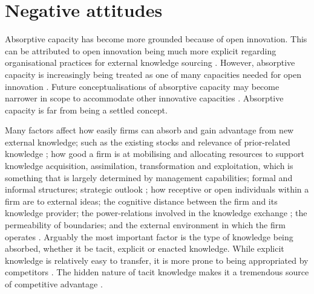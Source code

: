 \section{Negative attitudes}

Absorptive capacity has become more grounded because of open innovation. This can be attributed to open innovation being much more explicit regarding organisational practices for external knowledge sourcing \citep{volberda2010perspective}. However, absorptive capacity is increasingly being treated as one of many capacities needed for open innovation \citep[e.g.][]{lichtenthaler2009capability,lichtenthaler2010technology,robertson2012managing,ahn2016beyond}. Future conceptualisations of absorptive capacity may become narrower in scope to accommodate other innovative capacities \citep[viz.][]{lichtenthaler2009capability,lichtenthaler2010technology}. Absorptive capacity is far from being a settled concept. \medskip

Many factors affect how easily firms can absorb and gain advantage from new external knowledge; such as the existing stocks and relevance of prior-related knowledge \citep{cohen1990absorptive,lichtenthaler2016absorptive}; how good a firm is at mobilising and allocating resources to support knowledge acquisition, assimilation, transformation and exploitation, which is something that is largely determined by management capabilities; formal and informal structures; strategic outlook \citep{todorova2007absorptive,kim2016balancing,lichtenthaler2016absorptive}; how receptive or open individuals within a firm are to external ideas; the cognitive distance between the firm and its knowledge provider; the power-relations involved in the knowledge exchange \citep{nooteboom2000learning,todorova2007absorptive,easterby2008absorptive}; the permeability of boundaries; and the external environment in which the firm operates \citep{van1999coevolution,easterby2008absorptive}. Arguably the most important factor is the type of knowledge being absorbed, whether it be tacit, explicit or enacted knowledge. While explicit knowledge is relatively easy to transfer, it is more prone to being appropriated by competitors \citep{cohen1990absorptive,zahra2002absorptive,todorova2007absorptive,volberda2010perspective}. The hidden nature of tacit knowledge makes it a tremendous source of competitive advantage \citep{nelson1982evolutionary}. \medskip

